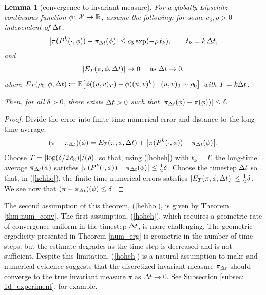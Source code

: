 \documentclass[11pt, twoside]{report}
\newtheorem{lemma}[theorem]{Lemma}
\begin{document}
\begin{lemma}[convergence to invariant measure]\label{lem_convergence_to_invariant} For a globally Lipschitz continuous function $\phi\colon\mathcal X\to \mathbb{R}$, assume the following:  for some $c_3,\rho>0$ independent of ${\Delta t}$, 
  \begin{equation}
    \left\lvert\pi(P^k(\cdot,\phi))-\pi_{\Delta t}(\phi)\right\rvert\le c_3 \exp(- \rho \,t_k), \qquad t_k=k\,{\Delta t},\label{hoheh}
\end{equation}
and
\begin{equation}
  \left\lvert E_T(\pi,\phi,{\Delta t})\right\rvert
  \to 0 \quad \text{ as ${\Delta t} \to 0$,}\label{hehho}
  \end{equation}
  where   $E_T(\rho_0,\phi,\tstep)\coloneq \mean{
    \phi((u,v)_T)-\phi((u,v)^k) \mid (u,v)_0\sim \rho_0}$ with $T=k{\Delta t}$.

   Then,   for all $\delta>0$, there exists ${\Delta t}>0$ such that
  $\left\lvert\pi_{{\Delta t}}(\phi)- \pi(\phi))\right\rvert \le \delta.
  $
  \end{lemma}
  \begin{proof} Divide the error into finite-time numerical error and distance to the long-time average:
\begin{equation*}
(\pi-\pi_\tstep)(\phi)
= E_T(\pi,\phi,\tstep)+\bp{\pi(P^k(\cdot,\phi))-\pi_\tstep(\phi)}.
\end{equation*}
Choose $T=\abs{\log(\delta/2\,c_3)}/(\rho)$, so that, using (\ref{hoheh}) with $t_k=T$, the long-time average $\pi_{\Delta t}(\phi)$ satisfies
  $\left\lvert\pi(P^k(\cdot,\phi))-\pi_{\Delta t}(\phi)\right\rvert\le  \frac12\delta$.
  Choose the timestep ${\Delta t}$ so that, in (\ref{hehho}),  the finite-time numerical errors satisfies $\left\lvert E_T(\pi,\phi,{\Delta t})\right\rvert
  \le  \frac 12\delta$. We see now that $
(\pi-\pi_{\Delta t})(\phi)\le \delta$.
  \end{proof}

The second assumption of this theorem, (\ref{hehho}), is given by Theorem \ref{thm:num_conv}.
The first assumption, (\ref{hoheh}), which requires a geometric rate of convergence uniform in the timestep ${\Delta t}$, is more challenging. The geometric ergodicity presented in Theorem \ref{num_erg} is geometric in the number of time steps, but the estimate degrades as the time step is decreased and is not sufficient. Despite this limitation, (\ref{hoheh}) is a natural assumption to make and numerical evidence suggests that the discretized invariant measure $\pi_{{\Delta t}}$ should converge to the true invariant measure $\pi$ as $\Delta t \to 0$. See Subsection \ref{subsec: 1d_experiment}, for example.
\end{document}

